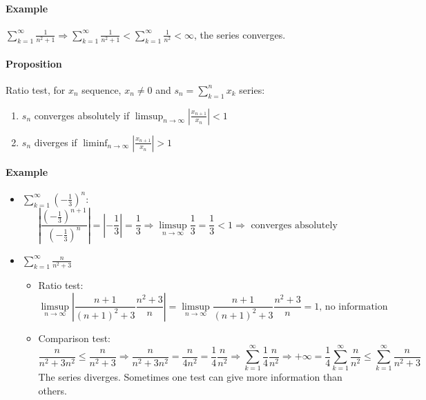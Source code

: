\documentclass{article}
\newcommand{\DS}{\displaystyle}
\newcommand{\abs}[1]{\left|#1\right|}
\newcommand{\limsupn}{\limsup_{n \to \infty}}
\newcommand{\liminfn}{\liminf_{n \to \infty}}
\newcommand{\sumn}[1]{\sum_{k=1}^n #1}
\newcommand{\series}[1]{\sum_{k=1}^\infty #1}
\newcommand{\Proposition}{\paragraph{Proposition}}
\newcommand{\Example}{\paragraph{Example}}
\begin{document}
  \Example $\DS \series \frac{1}{n^2+1} \Rightarrow \series \frac{1}{n^2+1} <
  \series \frac{1}{n^2} < \infty$, the series converges.

  \Proposition Ratio test, for $x_n$ sequence, $x_n \neq 0$ and $\DS
  s_n = \sumn{x_k}$ series:
  \begin{enumerate}[label=(\roman*)]
    \item $s_n$ converges absolutely if $\limsupn \abs{\frac{x_{n+1}}{x_n}} < 1$
    \item $s_n$ diverges if $\liminfn \abs{\frac{x_{n+1}}{x_n}} > 1$
  \end{enumerate}

  \Example
  \begin{itemize}
    \item $\DS \series\left({-\frac{1}{3}}\right)^n$:
    \begin{equation*}
      \abs{\frac{(-\frac{1}{3})^{n+1}}{(-\frac{1}{3})^n}} = \abs{-\frac{1}{3}}
      = \frac{1}{3} \Rightarrow \limsupn \frac{1}{3} = \frac{1}{3} < 1
      \Rightarrow \text{ converges absolutely}
    \end{equation*}
    \item $\DS \series \frac{n}{n^2+3}$
      \begin{itemize}
        \item Ratio test:
        \begin{equation*}
          \limsupn \abs{\frac{n+1}{(n+1)^2+3}\frac{n^2+3}{n}} =
          \limsupn \frac{n+1}{(n+1)^2+3}\frac{n^2+3}{n} = 1 \text{, no information}
        \end{equation*}
        \item Comparison test:
        \begin{equation*}
          \frac{n}{n^2+3n^2} \leq \frac{n}{n^2+3} \Rightarrow
          \frac{n}{n^2+3n^2} = \frac{n}{4n^2} = \frac{1}{4} \frac{n}{n^2}
          \Rightarrow \series \frac{1}{4} \frac{n}{n^2} \Rightarrow
          +\infty = \frac{1}{4} \series \frac{n}{n^2} \leq \series \frac{n}{n^2+3}
        \end{equation*}
        The series diverges. Sometimes one test can give more information than
        others.
      \end{itemize}
  \end{itemize}
\end{document}
